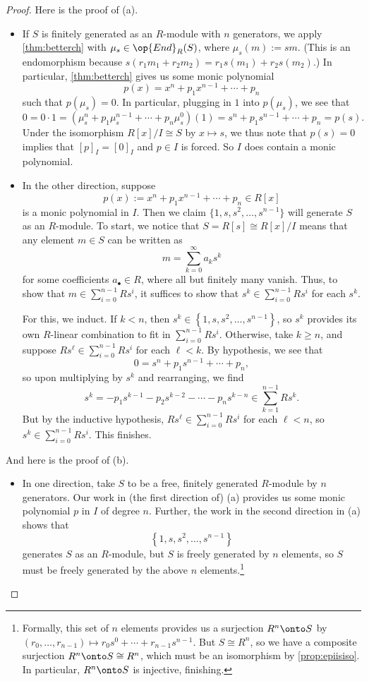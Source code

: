 \begin{proof}
	Here is the proof of (a).
	\begin{itemize}
		\item If $S$ is finitely generated as an $R$-module with $n$ generators, we apply \autoref{thm:betterch} with $\mu_s\in\op{End}_R(S)$, where $\mu_s(m):=sm$. (This is an endomorphism because $s(r_1m_1+r_2m_2)=r_1s(m_1)+r_2s(m_2)$.) In particular, \autoref{thm:betterch} gives us some monic polynomial
		\[p(x)=x^n+p_1x^{n-1}+\cdots+p_n\]
		such that $p(\mu_s)=0$. In particular, plugging in $1$ into $p(\mu_s)$, we see that
		\[0=0\cdot1=\left(\mu_s^n+p_1\mu_s^{n-1}+\cdots+p_n\mu_s^0\right)(1)=s^n+p_1s^{n-1}+\cdots+p_n=p(s).\]
		Under the isomorphism $R[x]/I\cong S$ by $x\mapsto s$, we thus note that $p(s)=0$ implies that $[p]_I=[0]_I$ and $p\in I$ is forced. So $I$ does contain a monic polynomial.

		\item In the other direction, suppose
		\[p(x):=x^n+p_1x^{n-1}+\cdots+p_n\in R[x]\]
		is a monic polynomial in $I$. Then we claim $\{1,s,s^2,\ldots,s^{n-1}\}$ will generate $S$ as an $R$-module. To start, we notice that $S=R[s]\cong R[x]/I$ means that any element $m\in S$ can be written as
		\[m=\sum_{k=0}^\infty a_ks^k\]
		for some coefficients $a_\bullet\in R$, where all but finitely many vanish. Thus, to show that $m\in\sum_{i=0}^{n-1}Rs^i$, it suffices to show that $s^k\in\sum_{i=0}^{n-1}Rs^i$ for each $s^k$.

		For this, we induct. If $k<n$, then $s^k\in\left\{1,s,s^2,\ldots,s^{n-1}\right\}$, so $s^k$ provides its own $R$-linear combination to fit in $\sum_{i=0}^{n-1}Rs^i$. Otherwise, take $k\ge n$, and suppose $Rs^\ell\in \sum_{i=0}^{n-1}Rs^i$ for each $\ell<k$. By hypothesis, we see that
		\[0=s^n+p_1s^{n-1}+\cdots+p_n,\]
		so upon multiplying by $s^k$ and rearranging, we find
		\[s^{k}=-p_1s^{k-1}-p_2s^{k-2}-\cdots-p_ns^{k-n}\in\sum_{k=1}^{n-1}Rs^k.\]
		But by the inductive hypothesis, $Rs^\ell\in \sum_{i=0}^{n-1}Rs^i$ for each $\ell<n$, so $s^k\in \sum_{i=0}^{n-1}Rs^i$. This finishes.
	\end{itemize}
	And here is the proof of (b).
	\begin{itemize}
		\item In one direction, take $S$ to be a free, finitely generated $R$-module by $n$ generators. Our work in (the first direction of) (a) provides us some monic polynomial $p$ in $I$ of degree $n$. Further, the work in the second direction in (a) shows that
		\[\left\{1,s,s^2,\ldots,s^{n-1}\right\}\]
		generates $S$ as an $R$-module, but $S$ is freely generated by $n$ elements, so $S$ must be freely generated by the above $n$ elements.\footnote{Formally, this set of $n$ elements provides us a surjection $R^n\onto S$ by $(r_0,\ldots,r_{n-1})\mapsto r_0s^0+\cdots+r_{n-1}s^{n-1}$. But $S\cong R^n$, so we have a composite surjection $R^n\onto S\cong R^n$, which must be an isomorphism by \autoref{prop:epiisiso}. In particular, $R^n\onto S$ is injective, finishing.} 
		

\end{itemize}
\end{proof}
